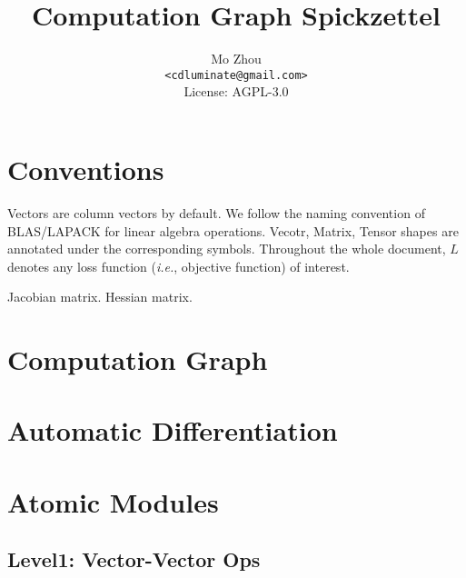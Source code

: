\documentclass[9pt,twocolumn,times]{article}
\title{Computation Graph Spickzettel}
\author{Mo Zhou\\\small\texttt{<cdluminate@gmail.com>}\\
License: AGPL-3.0}
\begin{document}
\maketitle
\tableofcontents
\newpage

\section{Conventions}

Vectors are column vectors by default.
We follow the naming convention of BLAS/LAPACK for linear algebra operations.
Vecotr, Matrix, Tensor shapes are annotated under the corresponding symbols.
Throughout the whole document, $L$ denotes any loss function (\emph{i.e.},
objective function) of interest.

Jacobian matrix. Hessian matrix.

\section{Computation Graph}

\section{Automatic Differentiation}

\section{Atomic Modules}

\subsection{Level1: Vector-Vector Ops}
\end{document}
